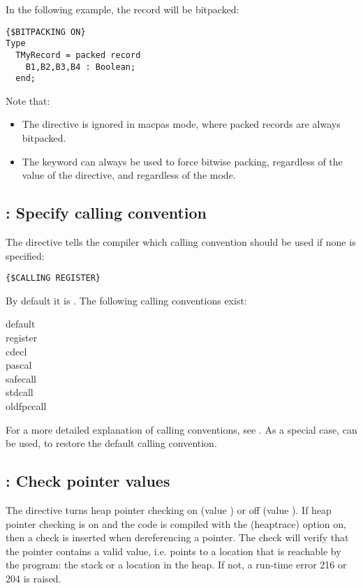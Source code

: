 In the following example, the  record will be bitpacked:
\begin{verbatim}
{$BITPACKING ON}
Type
  TMyRecord = packed record
    B1,B2,B3,B4 : Boolean;
  end;
\end{verbatim}

Note that:
\begin{itemize}
\item The  directive is ignored in macpas mode, where
packed records are always bitpacked.
\item The  keyword can always be used to force bitwise
packing, regardless of the value of the  directive, and
regardless of the mode.
\end{itemize}

\subsection{ : Specify calling convention}
\label{se:dircalling}
The  directive tells the compiler which calling 
convention should be used if none is specified:
\begin{verbatim}
{$CALLING REGISTER}
\end{verbatim}
 By default it is . The following calling conventions exist:
\begin{description}
\item[default]
\item[register]
\item[cdecl]
\item[pascal]
\item[safecall]
\item[stdcall]
\item[oldfpccall]
\end{description}
For a more detailed explanation of calling conventions, see .
As a special case,  can be used, to restore the default calling
convention.

\subsection{ : Check pointer values}
The  directive turns heap pointer checking on (value
) or off (value ). If heap pointer checking is on and the
code is compiled with the  (heaptrace) option on, then a check is
inserted when dereferencing a pointer. The check will verify that the
pointer contains a valid value, i.e. points to a location that is reachable
by the program: the stack or a location in the heap. If not, a run-time error
216 or 204 is raised.

